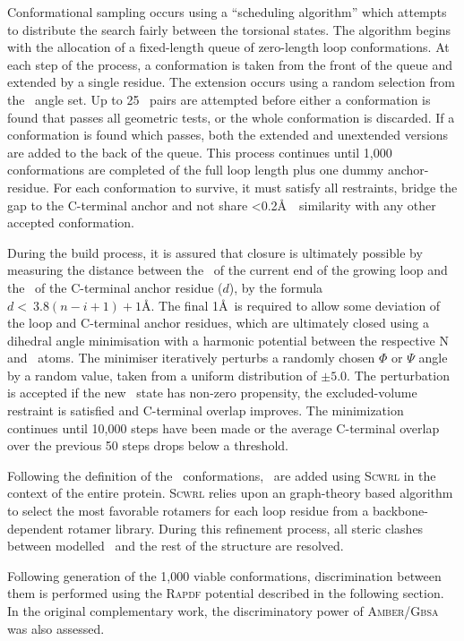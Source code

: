Conformational sampling occurs using a ``scheduling algorithm'' which attempts to distribute the search fairly between the torsional states.
The algorithm begins with the allocation of a fixed-length queue of zero-length loop conformations. At each step of
the process, a conformation is taken from the front of the queue and extended by
a single residue. The extension occurs using a random selection from the
\phipsi\ angle set. Up to 25 \phipsi\ pairs are attempted before either a conformation
is found that passes all geometric tests, or the whole conformation
is discarded. If a conformation is found which passes, both the extended
and unextended versions are added to the back of the queue. This process
continues until 1,000 conformations are completed of the full loop length
plus one dummy anchor-residue. For each conformation to survive, it must satisfy all restraints, bridge the gap to the C-terminal anchor and not share \textless0.2\AA\  \crms\ similarity with any other accepted conformation.

During the build process, it is assured that closure is ultimately possible by measuring
the distance between the \ca\ of the current end of the growing loop and
the \ca\ of the  C-terminal anchor residue ($d$), by the formula $d <\ 3.8(n-i+1)+1$\AA.
The final 1\AA\ is required to allow some deviation of the loop and C-terminal
anchor residues, which are ultimately closed using a dihedral angle minimisation
with a harmonic potential between the respective N and \ca\ atoms. The minimiser iteratively perturbs a randomly chosen $\Phi$ or $\Psi$ angle by a random value, taken from a uniform distribution
of $\pm 5.0$\degree. The perturbation is accepted if the new
\phipsi\ state has non-zero propensity, the excluded-volume
restraint is satisfied and C-terminal overlap improves. The minimization
continues until 10,000 steps have been made or the average C-terminal overlap
over the previous 50 steps drops below a threshold. 

Following the definition of the \mainchain\ conformations, \sidechains\ are added using \textsc{Scwrl}\cite{METHOD:SCWRL_1} in the context of the entire protein. \textsc{Scwrl} relies upon an graph-theory based algorithm to select the most favorable rotamers for each loop residue from a backbone-dependent rotamer library. During this refinement
process, all steric clashes between modelled \sidechains\
and the rest of the structure are resolved.

Following generation of the 1,000 viable conformations, discrimination between them
is performed using the \textsc{Rapdf} potential described in the following
section. In the original complementary work\cite{METHOD:RapperA}, the discriminatory
power of \textsc{Amber/Gbsa} was also assessed.
 

